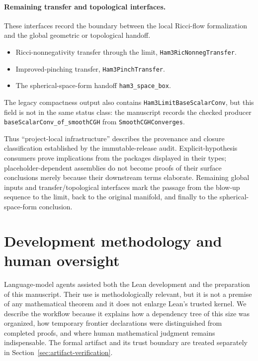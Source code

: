 \documentclass[11pt]{article}
\theoremstyle{plain}
\theoremstyle{definition}
\theoremstyle{remark}
\newcommand{\leanref}[1]{\nolinkurl{#1}}
\begin{document}
\paragraph{Remaining transfer and topological interfaces.}
These interfaces record the boundary between the local Ricci-flow formalization
and the global geometric or topological handoff.
\begin{itemize}[leftmargin=2em]
  \item Ricci-nonnegativity transfer through the limit,
  \leanref{Ham3RicNonnegTransfer}.
  \item Improved-pinching transfer, \leanref{Ham3PinchTransfer}.
  \item The spherical-space-form handoff \leanref{ham3_space_box}.
\end{itemize}

The legacy compactness output also contains
\leanref{Ham3LimitBaseScalarConv}, but this field is not in the same status
class: the manuscript records the checked producer
\leanref{baseScalarConv_of_smoothCGH} from \leanref{SmoothCGHConverges}.

Thus ``project-local infrastructure'' describes the provenance and closure
classification established by the immutable-release audit.
Explicit-hypothesis consumers prove implications from the packages displayed
in their types; placeholder-dependent assemblies do not become proofs of their
surface conclusions merely because their downstream terms elaborate.
Remaining global inputs and transfer/topological interfaces mark the passage
from the blow-up sequence to the limit, back to the original manifold, and
finally to the spherical-space-form conclusion.

\section{Development methodology and human oversight}
\label{sec:auto-formalization-workflow}

Language-model agents assisted both the Lean development and the preparation
of this manuscript.  Their use is methodologically relevant, but it is not a
premise of any mathematical theorem and it does not enlarge Lean's trusted
kernel.  We describe the workflow because it explains how a dependency tree of
this size was organized, how temporary frontier declarations were distinguished
from completed proofs, and where human mathematical judgment
remains indispensable.  The formal artifact and its trust boundary are
treated separately in Section~\ref{sec:artifact-verification}.
\end{document}
